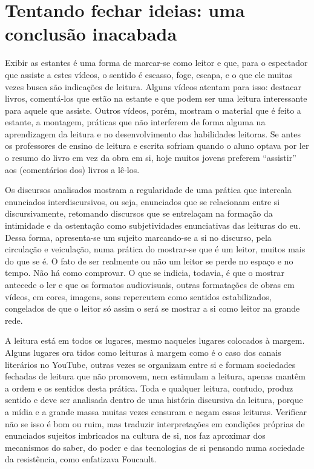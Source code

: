 \section{Tentando fechar ideias: uma conclusão inacabada}\label{sec-tentandofecharideias}

Exibir as estantes é uma forma de marcar-se como leitor e que, para o
espectador que assiste a estes vídeos, o sentido é escasso, foge,
escapa, e o que ele muitas vezes busca são indicações de leitura. Alguns
vídeos atentam para isso: destacar livros, comentá-los que estão na
estante e que podem ser uma leitura interessante para aquele que
assiste. Outros vídeos, porém, mostram o material que é feito a estante,
a montagem, práticas que não interferem de forma alguma na aprendizagem
da leitura e no desenvolvimento das habilidades leitoras. Se antes os
professores de ensino de leitura e escrita sofriam quando o aluno optava
por ler o resumo do livro em vez da obra em si, hoje muitos jovens
preferem \enquote{assistir} aos (comentários dos) livros a lê-los.

Os discursos analisados mostram a regularidade de uma prática que
intercala enunciados interdiscursivos, ou seja, enunciados que se
relacionam entre si discursivamente, retomando discursos que se
entrelaçam na formação da intimidade e da ostentação como subjetividades
enunciativas das leituras do eu. Dessa forma, apresenta-se um sujeito
marcando-se a si no discurso, pela circulação e veiculação, numa prática
do mostrar-se que é um leitor, muitos mais do que se é. O fato de ser
realmente ou não um leitor se perde no espaço e no tempo. Não há como
comprovar. O que se indicia, todavia, é que o mostrar antecede o ler e
que os formatos audiovisuais, outras formatações de obras em vídeos, em
cores, imagens, sons repercutem como sentidos estabilizados, congelados
de que o leitor só assim o será se mostrar a si como leitor na grande
rede.

A leitura está em todos os lugares, mesmo naqueles lugares colocados à
margem. Alguns lugares ora tidos como leituras à margem como é o caso
dos canais literários no YouTube, outras vezes se organizam entre si e
formam sociedades fechadas de leitura que não promovem, nem estimulam a
leitura, apenas mantêm a ordem e os sentidos desta prática. Toda e
qualquer leitura, contudo, produz sentido e deve ser analisada dentro de
uma história discursiva da leitura, porque a mídia e a grande massa
muitas vezes censuram e negam essas leituras. Verificar não se isso é
bom ou ruim, mas traduzir interpretações em condições próprias de
enunciados sujeitos imbricados na cultura de si, nos faz aproximar dos
mecanismos do saber, do poder e das tecnologias de si pensando numa
sociedade da resistência, como enfatizava Foucault.
